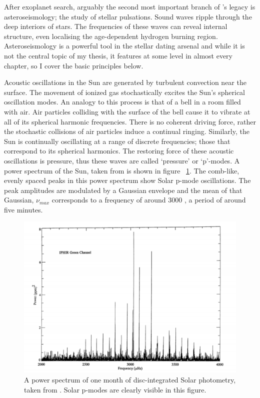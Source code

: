 After exoplanet search, arguably the second most important branch of \kepler's
legacy is asteroseismology; the study of stellar pulsations.
Sound waves ripple through the deep interiors of stars.
The frequencies of these waves can reveal internal structure, even localising
the age-dependent hydrogen burning region.
Asteroseismology is a powerful tool in the stellar dating arsenal and while it
is not the central topic of my thesis, it features at some level in almost
every chapter, so I cover the basic principles below.

Acoustic oscillations in the Sun are generated by turbulent convection near
the surface.
The movement of ionized gas stochastically excites the Sun's spherical
oscillation modes.
An analogy to this process is that of a bell in a room filled with air.
Air particles colliding with the surface of the bell cause it to vibrate at
all of its spherical harmonic frequencies.
There is no coherent driving force, rather the stochastic collisions of air
particles induce a continual ringing.
Similarly, the Sun is continually oscillating at a range of discrete
frequencies; those that correspond to its spherical harmonics.
The restoring force of these acoustic oscillations is pressure, thus these
waves are called `pressure' or `p'-modes.
A power spectrum of the Sun, taken from \citet{Brown2000} is shown in figure
~\ref{fig:solar_spectrum}.
The comb-like, evenly spaced peaks in this power spectrum show Solar p-mode
oscillations.
The peak amplitudes are modulated by a Gaussian envelope and the mean of that
Gaussian, $\nu_{max}$ corresponds to a frequency of around 3000 \uHz, a period
of around five minutes.

\begin{figure}[p]
\begin{center}
\includegraphics[width=6in, clip=true]{figures/solar_spectrum.pdf}
\caption[Solar power spectrum.]{A power spectrum of one month of
disc-integrated Solar photometry, taken from \citet{Toutain1992}.
Solar p-modes are clearly visible in this figure.}
\label{fig:solar_spectrum}
\end{center}
\end{figure}

